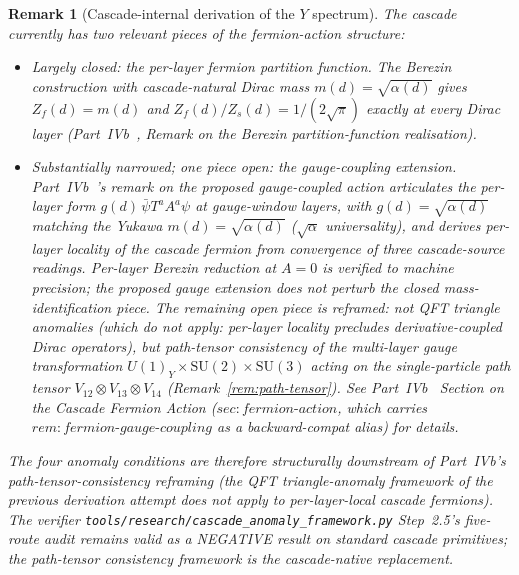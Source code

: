 \documentclass[12pt,a4paper]{article}
\newtheorem{remark}[theorem]{Remark}
\begin{document}
\begin{remark}[Cascade-internal derivation of the $Y$ spectrum]
The cascade currently has two relevant pieces of the fermion-action
structure:
\begin{itemize}
\item \emph{Largely closed:} the per-layer fermion partition function.
The Berezin construction with cascade-natural Dirac mass
$m(d)=\sqrt{\alpha(d)}$ gives $Z_f(d)=m(d)$ and
$Z_f(d)/Z_s(d)=1/(2\sqrt{\pi})$ exactly at every Dirac layer
(Part~IVb~\cite{part4b}, Remark on the Berezin partition-function
realisation).
\item \emph{Substantially narrowed; one piece open:} the
gauge-coupling extension. Part~IVb~\cite{part4b}'s remark on the
proposed gauge-coupled action articulates the per-layer form
$g(d)\,\bar\psi T^a A^a \psi$ at gauge-window layers, with
$g(d) = \sqrt{\alpha(d)}$ matching the Yukawa $m(d) = \sqrt{\alpha(d)}$
($\sqrt{\alpha}$ universality), and \emph{derives} per-layer locality
of the cascade fermion from convergence of three cascade-source
readings. Per-layer Berezin reduction at $A=0$ is verified to machine
precision; the proposed gauge extension does not perturb the closed
mass-identification piece. The remaining open piece is reframed:
\emph{not} QFT triangle anomalies (which do not apply: per-layer
locality precludes derivative-coupled Dirac operators), but
\emph{path-tensor consistency} of the multi-layer gauge transformation
$U(1)_Y\times\mathrm{SU}(2)\times\mathrm{SU}(3)$ acting on the
single-particle path tensor $V_{12}\otimes V_{13}\otimes V_{14}$
(Remark~\ref{rem:path-tensor}). See
Part~IVb~\cite{part4b} Section on the Cascade Fermion Action
($\mathit{sec{:}fermion\text{-}action}$, which carries
$\mathit{rem{:}fermion\text{-}gauge\text{-}coupling}$ as a
backward-compat alias) for details.
\end{itemize}
The four anomaly conditions are therefore \emph{structurally
downstream} of Part~IVb's path-tensor-consistency reframing (the QFT
triangle-anomaly framework of the previous derivation attempt does not
apply to per-layer-local cascade fermions). The verifier
\texttt{tools/research/cascade\_anomaly\_framework.py} Step~2.5's
five-route audit remains valid as a NEGATIVE result on standard
cascade primitives; the path-tensor consistency framework is the
cascade-native replacement.


\end{remark}
\end{document}
